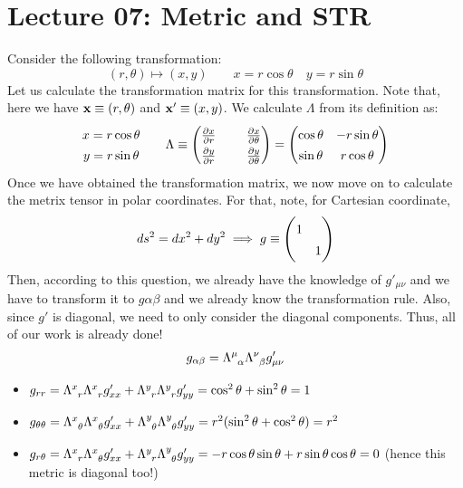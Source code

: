 \section*{Lecture 07: Metric and STR}
Consider the following transformation:
$$(r,\theta) \mapsto (x,y) \qquad x = r\cos\theta \quad y = r\sin\theta$$
Let us calculate the transformation matrix for this transformation. Note that, here we have $\vb{x} \equiv (r,\theta)$ and $\vb{x}' \equiv (x,y)$. We calculate $\Lambda$  from its definition as:
\[
\begin{gathered}
\begin{matrix}
    x = r\cos\theta\\
    y=r\sin\theta
\end{matrix}\qquad
\Lambda \equiv
\begingroup
\setlength{\arraycolsep}{12pt}   %
\renewcommand{\arraystretch}{1.35}%
\begin{pmatrix}
  \pdv{x}{r}      & \pdv{x}{\theta}\\
  \pdv{y}{r}      & \pdv{y}{\theta}
\end{pmatrix}
\endgroup
=
\begin{pmatrix}
  \cos\theta & -r\sin\theta\\
  \sin\theta &  r\cos\theta
\end{pmatrix}
\end{gathered}
\]
Once we have obtained the transformation matrix, we now move on to calculate the metrix tensor in polar coordinates. For that, note, for Cartesian coordinate, 
$$ds^2 = dx^2 + dy^2 \implies g\equiv \mqty(\dmat{1,1})$$
Then, according to this question, we already have the knowledge of $g'_{\mu\nu}$ and we have to transform it to $g{\alpha\beta}$ and we already know the transformation rule. Also, since $g'$ is diagonal, we need to only consider the diagonal components. Thus, all of our work is already done!
\begin{align*}
    g_{\alpha\beta} = \tensor{\Lambda}{^\mu _\alpha}\tensor{\Lambda}{^\nu _\beta}g'_{\mu\nu}
\end{align*}
\begin{itemize}
    \item $g_{rr} = \tensor{\Lambda}{^x _r}\tensor{\Lambda}{^x _r}g'_{xx}+\tensor{\Lambda}{^y _r}\tensor{\Lambda}{^y _r}g'_{yy} = \cos^2\theta+\sin^2\theta=1$
    \item $g_{\theta\theta} = \tensor{\Lambda}{^x _\theta}\tensor{\Lambda}{^x _\theta}g'_{xx}+\tensor{\Lambda}{^y _\theta}\tensor{\Lambda}{^y _\theta}g'_{yy} = r^2(\sin^2\theta+\cos^2\theta)=r^2$
    \item $g_{r\theta} = \tensor{\Lambda}{^x _r}\tensor{\Lambda}{^x _\theta}g'_{xx}+\tensor{\Lambda}{^y _r}\tensor{\Lambda}{^y _\theta}g'_{yy} = -r\cos\theta\sin\theta + r \sin\theta\cos\theta = 0 $ (hence this metric is diagonal too!)
\end{itemize}
